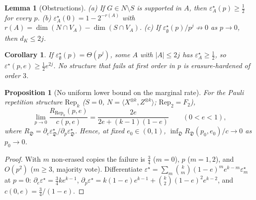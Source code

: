 \documentclass[11pt,a4paper]{article}
\theoremstyle{plain}
\newtheorem{lemma}[theorem]{Lemma}
\newtheorem{proposition}[theorem]{Proposition}
\newtheorem{corollary}[theorem]{Corollary}
\theoremstyle{definition}
\theoremstyle{remark}
\newcommand{\err}{\varepsilon^{\star}}
\newcommand{\Rep}{\mathrm{Rep}}
\begin{document}
\begin{lemma}[Obstructions]\label{lem:obstructions}
(a) If $G\in N\setminus S$ is supported in $A$, then $\err_A(p)\ge\tfrac12$ for every $p$.
(b) $\err_A(0)=1-2^{-r(A)}$ with $r(A)=\dim(N\cap V_A)-\dim(S\cap V_A)$.
(c) If $\err_\emptyset(p)/p^j\not\to0$ as $p\to0$, then $d_K\le2j$.
\end{lemma}

\begin{corollary}\label{cor:hardening}
If $\err_\emptyset(p)=\Theta(p^j)$, some $A$ with $|A|\le2j$ has $\err_A\ge\tfrac12$, so $\err(p,e)\ge\tfrac12e^{2j}$. No structure that fails at first order in $p$ is erasure-hardened of order $3$.
\end{corollary}

\begin{proposition}[No uniform lower bound on the marginal rate]\label{prop:rate-small-p}
For the Pauli repetition structure $\Rep_k$ ($S=0$, $N=\langle X^{\otimes k},Z^{\otimes k}\rangle$; $\Rep_2=F_2$),
\[
\lim_{p\to0}\frac{R_{\Rep_k}(p,e)}{c(p,e)}=\frac{2e}{2e+(k-1)(1-e)}\qquad(0<e<1),
\]
where $R_{\mathfrak D}=\partial_e\err_{\mathfrak D}/\partial_p\err_{\mathfrak D}$. Hence, at fixed $e_0\in(0,1)$, $\inf_{\mathfrak D}R_{\mathfrak D}(p_0,e_0)/c\to0$ as $p_0\to0$.
\end{proposition}
\begin{proof}
With $m$ non-erased copies the failure is $\tfrac34$ ($m=0$), $p$ ($m=1,2$), and $O(p^2)$ ($m\ge3$, majority vote). Differentiate $\err=\sum_m\binom km(1-e)^me^{k-m}\err_m$ at $p=0$: $\partial_e\err=\tfrac34ke^{k-1}$, $\partial_p\err=k(1-e)e^{k-1}+\binom k2(1-e)^2e^{k-2}$, and $c(0,e)=\tfrac34/(1-e)$.
\end{proof}
\end{document}
